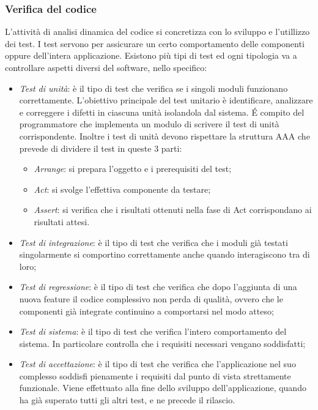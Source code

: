 \subsubsection{Verifica del codice}
L'attività di analisi dinamica del codice si concretizza con lo sviluppo e l'utillizzo dei test. I test servono per assicurare un certo comportamento delle componenti oppure dell'intera applicazione. Esistono più tipi di test ed ogni tipologia va a controllare aspetti diversi del software, nello specifico:
\begin{itemize}
    \item \textit{Test di unità}:  è il tipo di test che verifica se i singoli moduli funzionano correttamente. L'obiettivo principale del test unitario è identificare, analizzare e correggere i difetti in ciascuna unità isolandola dal sistema. É compito del programmatore che implementa un modulo di scrivere il test di unità corrispondente. Inoltre i test di unità devono rispettare la struttura AAA che prevede di dividere il test in queste 3 parti:
	\begin{itemize}
		\item \textit{Arrange}: si prepara l'oggetto e i prerequisiti del test;
		\item \textit{Act}: si svolge l'effettiva componente da testare;
		\item \textit{Assert}: si verifica che i risultati ottenuti nella fase di Act corrispondano ai risultati attesi.
	\end{itemize}
    \item \textit{Test di integrazione}: è il tipo di test che verifica che i moduli già testati singolarmente si comportino correttamente anche quando interagiscono tra di loro;
    \item \textit{Test di regressione}: è il tipo di test che verifica che dopo l'aggiunta di una nuova feature il codice complessivo non perda di qualità, ovvero che le componenti già integrate continuino a comportarsi nel modo atteso;
    \item \textit{Test di sistema}:  è il tipo di test che verifica l'intero comportamento del sistema. In particolare controlla che i requisiti necessari vengano soddisfatti;
    \item \textit{Test di accettazione}:  è il tipo di test che verifica che l'applicazione nel suo complesso soddisfi pienamente i requisiti dal punto di vista strettamente funzionale. Viene effettuato alla fine dello sviluppo dell'applicazione, quando ha già superato tutti gli altri test, e ne precede il rilascio.
\end{itemize}

